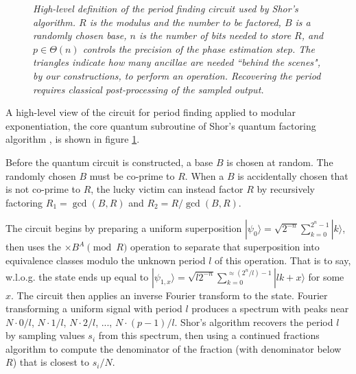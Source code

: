 \documentclass[twocolumn]{article}
\begin{document}
\begin{figure}
  \centering
  \caption{\em
	High-level definition of the period finding circuit \cite{Shor1999} used by Shor's algorithm.
	$R$ is the modulus and the number to be factored, $B$ is a randomly chosen base, $n$ is the number of bits needed to store $R$, and $p \in \Theta(n)$ controls the precision of the phase estimation step.
    The triangles indicate how many ancillae are needed ``behind the scenes", by our constructions, to perform an operation.
	Recovering the period requires classical post-processing of the sampled output.
  }
  \label{fig:period-finding}
\end{figure}

A high-level view of the circuit for period finding applied to modular exponentiation, the core quantum subroutine of Shor's quantum factoring algorithm \cite{Shor1999}, is shown in figure \ref{fig:period-finding}.

Before the quantum circuit is constructed, a base $B$ is chosen at random.
The randomly chosen $B$ must be co-prime to $R$.
When a $B$ is accidentally chosen that is not co-prime to $R$, the lucky victim can instead factor $R$ by recursively factoring $R_1 = \gcd(B, R)$ and $R_2 = R / \gcd(B, R)$.

The circuit begins by preparing a uniform superposition $|\psi_0\rangle = \sqrt{2^{-n}} \sum_{k=0}^{2^n-1} |k\rangle$, then uses the $\times B^A {\pmod R}$ operation to separate that superposition into equivalence classes modulo the unknown period $l$ of this operation.
That is to say, w.l.o.g. the state ends up equal to $|\psi_{1,x}\rangle = \sqrt{l 2^{-n}} \sum_{k=0}^{\approx (2^n/l)-1} |l k + x \rangle$ for some $x$.
The circuit then applies an inverse Fourier transform to the state.
Fourier transforming a uniform signal with period $l$ produces a spectrum with peaks near $N \cdot 0/l$, $N \cdot 1/l$, $N \cdot 2/l$, ..., $N \cdot (p-1)/l$.
Shor's algorithm recovers the period $l$ by sampling values $s_i$ from this spectrum, then using a continued fractions algorithm to compute the denominator of the fraction (with denominator below $R$) that is closest to $s_i/N$.
\end{document}
